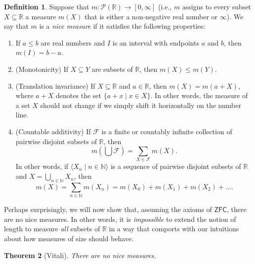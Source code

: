 \documentclass[a4paper]{memoir}
\newtheorem{theorem}{Theorem}[section]
\theoremstyle{definition}
\newtheorem{definition}[theorem]{Definition}
\newcommand{\bb}{\mathbb}
\newcommand{\power}{\ensuremath{\mathscr{P}}}
\begin{document}
\begin{definition} \label{def: nice measure}
  Suppose that $m : \power(\mathbb{R}) \rightarrow [0,\infty]$ (i.e., $m$ assigns to every subset 
  $X \subseteq \mathbb{R}$ a measure $m(X)$ that is either a non-negative real number or $\infty$). 
  We say that $m$ is a \emph{nice measure} if it satisfies the following properties:
  \begin{enumerate}
    \item If $a \leq b$ are real numbers and $I$ is an interval with endpoints $a$ and $b$, then 
    $m(I) = b-a$.
    \item (Monotonicity) If $X \subseteq Y$ are subsets of $\bb{R}$, then $m(X) \leq m(Y)$.
    \item (Translation invariance) If $X \subseteq \bb{R}$ and $a \in \bb{R}$, then 
    $m(X) = m(a + X)$, where $a + X$ denotes the set $\{a + x \mid x \in X\}$. In other words, 
    the measure of a set $X$ should not change if we simply shift it horizontally on the number line.
    \item (Countable additivity) If $\mathcal{F}$ is a finite or countably infinite collection of pairwise disjoint
    subsets of $\bb{R}$, then
    \[
      m\left(\bigcup \mathcal{F}\right) = \sum_{X \in \mathcal{F}} m(X).
    \]
    In other words, if $\langle X_n \mid n \in \mathbb{N} \rangle$ is a sequence of pairwise 
    disjoint subsets of $\bb{R}$ and $X  = \bigcup_{n \in \mathbb{N}} X_n$, then 
    \[
      m(X) = \sum_{n \in \bb{N}} m(X_n) = m(X_0) + m(X_1) + m(X_2) + \ldots.
    \]
  \end{enumerate}
\end{definition}

Perhaps surprisingly, we will now show that, assuming the axioms of $\mathsf{ZFC}$, there 
are no nice measures. In other words, it is \emph{impossible} to extend the notion of length to 
measure \emph{all} subsets of $\mathbb{R}$ in a way that comports with our intuitions about 
how measures of size should behave.

\begin{theorem}[Vitali] \label{thm: vitali}
  There are no nice measures.
\end{theorem}
\end{document}
